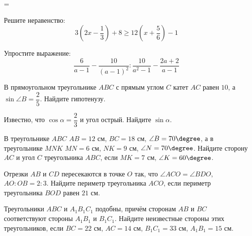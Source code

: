 =%
\begin{exam}
	\begin{listofex}
		\item Решите неравенство:
		\[3\left( 2x-\dfrac{1}{3} \right)+8\ge12\left( x+\dfrac{5}{6} \right)-1\]
		\item Упростите выражение:
		\[\dfrac{6}{a-1}-\dfrac{10}{(a-1)^2}:\dfrac{10}{a^2-1}-\dfrac{2a+2}{a-1}\]
		\item В прямоугольном треугольнике \( ABC \) с прямым углом \( C \) катет \( AC \) равен \( 10 \), а \( \sin\angle B=\dfrac{2}{5} \). Найдите гипотенузу.
		\item Известно, что \( \cos\alpha=\dfrac{2}{3} \) и угол острый. Найдите \( \sin\alpha \).
		\item В треугольнике \( ABC \) \( AB=12 \) см, \( BC=18 \) см, \( \angle B=70\degree \), а в треугольнике \( MNK \) \( MN=6 \) см, \( NK=9 \) см, \( \angle N=70\degree \). Найдите сторону \( AC \) и угол \( C \) треугольника \( ABC \), если \( MK=7 \) см, \( \angle K=60\degree \).
		\item Отрезки \( AB \) и \( CD \) пересекаются в точке \( O \) так, что \( \angle ACO=\angle BDO \), \( AO:OB=2:3 \). Найдите периметр треугольника \( ACO \), если периметр треугольника \( BOD \) равен \( 21 \) см.
		\item Треугольники \( ABC \) и \( A_1B_1C_1 \) подобны, причём сторонам \( AB \) и \( BC \) соответствуют стороны \( A_1B_1 \) и \( B_1C_1 \). Найдите неизвестные стороны этих треугольников, если \( BC=22 \) см, \( AC=14 \) см, \( B_1C_1=33 \) см, \( A_1B_1=15 \) см.
	\end{listofex}
\end{exam}

